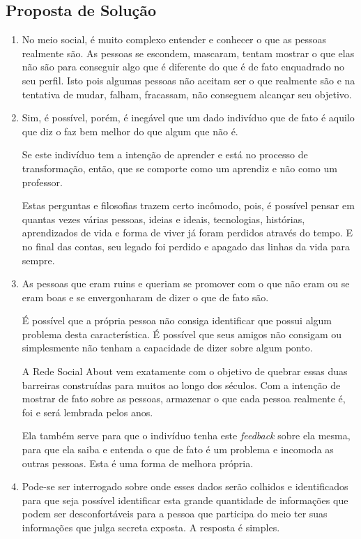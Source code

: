 \subsection{Proposta de Solução}
\label{sub:propostadesolucao}

\begin{enumerate}
    \item No meio social, é muito complexo entender e conhecer o que as 
        pessoas
        realmente são. As pessoas se escondem, mascaram, tentam mostrar o que elas não
        são para conseguir algo que é diferente do que é de fato enquadrado no seu
        perfil. Isto pois algumas pessoas não aceitam ser o que realmente são e na
        tentativa de mudar, falham, fracassam, não conseguem alcançar seu objetivo.

    \item Sim, é possível, porém, é inegável que um
        dado indivíduo que de fato é aquilo que diz o faz bem melhor do que algum
        que não é.

        Se este indivíduo tem a intenção de aprender e está no processo de transformação,
        então, que se comporte como um aprendiz e não como um professor.

        Estas perguntas e filosofias trazem certo incômodo, pois, é possível pensar em quantas 
        vezes várias
        pessoas, ideias e ideais, tecnologias, histórias, aprendizados de vida e forma de
        viver já foram perdidos através do tempo. E no final das contas, seu legado foi
        perdido e apagado das linhas da vida para sempre.

    \item As pessoas que eram ruins e queriam se promover com o que não eram 
        ou se eram boas e se envergonharam de dizer o que de fato são.

        É possível que a própria pessoa não consiga identificar que possui algum problema
        desta característica. É possível que seus amigos não
        consigam ou simplesmente não tenham a capacidade de dizer sobre algum ponto.

        A Rede Social About vem exatamente com o objetivo de quebrar essas duas barreiras construídas
        para muitos ao longo dos séculos. Com a intenção de mostrar de fato sobre as pessoas,
        armazenar o que cada pessoa realmente é, foi e será lembrada pelos anos.

        Ela também serve para que o indivíduo tenha este \textit{feedback} sobre ela mesma, para que ela
        saiba e entenda o que de fato é um problema e incomoda as outras pessoas. Esta é uma forma
        de melhora própria. 
    \item Pode-se ser interrogado sobre onde esses dados serão colhidos e identificados para que seja
        possível identificar esta grande quantidade de informações que podem ser desconfortáveis
        para a pessoa que participa do meio ter suas informações que julga secreta exposta. A resposta
        é simples.


\end{enumerate}
